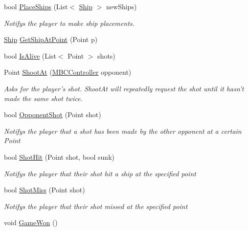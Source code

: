\begin{DoxyCompactItemize}
bool \hyperlink{class_m_b_c_core_1_1_m_b_c_controller_a37f81e0b9ab453dd7c1cb0d9962d9d4c}{Place\-Ships} (List$<$ \hyperlink{class_m_b_c_core_1_1_ship}{Ship} $>$ new\-Ships)
\begin{DoxyCompactList}\small\item\em Notifys the player to make ship placements.\end{DoxyCompactList}\item 
\hyperlink{class_m_b_c_core_1_1_ship}{Ship} \hyperlink{class_m_b_c_core_1_1_m_b_c_controller_a33631302a5a1dc178fe0dd40281b378b}{Get\-Ship\-At\-Point} (Point p)
\item 
bool \hyperlink{class_m_b_c_core_1_1_m_b_c_controller_aa814e0e42b62809c0c13651e4a7acdbe}{Is\-Alive} (List$<$ Point $>$ shots)
\item 
Point \hyperlink{class_m_b_c_core_1_1_m_b_c_controller_aa1687c033a16602ac71d6a285f613878}{Shoot\-At} (\hyperlink{class_m_b_c_core_1_1_m_b_c_controller}{M\-B\-C\-Controller} opponent)
\begin{DoxyCompactList}\small\item\em Asks for the player's shot. Shoot\-At will repeatedly request the shot until it hasn't made the same shot twice.\end{DoxyCompactList}\item 
bool \hyperlink{class_m_b_c_core_1_1_m_b_c_controller_a7d6ed60217cbc245ebc82ff5bcf3f450}{Opponent\-Shot} (Point shot)
\begin{DoxyCompactList}\small\item\em Notifys the player that a shot has been made by the other opponent at a certain Point\end{DoxyCompactList}\item 
bool \hyperlink{class_m_b_c_core_1_1_m_b_c_controller_ad76edc11c56d5c8522a62024627c1418}{Shot\-Hit} (Point shot, bool sunk)
\begin{DoxyCompactList}\small\item\em Notifys the player that their shot hit a ship at the specified point\end{DoxyCompactList}\item 
bool \hyperlink{class_m_b_c_core_1_1_m_b_c_controller_ac155df683003b696508b059a651c151b}{Shot\-Miss} (Point shot)
\begin{DoxyCompactList}\small\item\em Notifys the player that their shot missed at the specified point\end{DoxyCompactList}\item 
\hypertarget{class_m_b_c_core_1_1_m_b_c_controller_a26d3bd560e07b2c34df10963767a1d4f}{void \hyperlink{class_m_b_c_core_1_1_m_b_c_controller_a26d3bd560e07b2c34df10963767a1d4f}{Game\-Won} ()}\label{class_m_b_c_core_1_1_m_b_c_controller_a26d3bd560e07b2c34df10963767a1d4f}


\end{DoxyCompactItemize}
